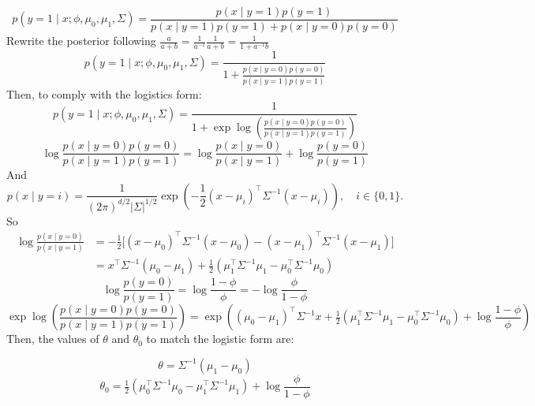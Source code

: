 \begin{answer}

$$
p(y=1\mid x;\phi,\mu_0,\mu_1,\Sigma)
= \frac{p(x\mid y=1)p(y=1)}
       {p(x\mid y=1)p(y=1) + p(x\mid y=0)p(y=0)}
$$
Rewrite the posterior following $\frac{a}{a+b} = \frac{1}{a^{-1}} \frac{1}{a+b} = \frac{1}{1+a^{-1}b}$
$$
p(y=1\mid x;\phi,\mu_0,\mu_1,\Sigma)
= \frac{1}
       {1 + \frac{p(x\mid y=0)p(y=0)}{p(x\mid y=1)p(y=1)}}
$$
Then, to comply with the logistics form:
$$
p(y=1\mid x;\phi,\mu_0,\mu_1,\Sigma)
= \frac{1}
       {1 + \exp \log \left( \frac{p(x\mid y=0)p(y=0)}{p(x\mid y=1)p(y=1)} \right)}
$$
$$
\log\frac{p(x\mid y=0)p(y=0)}{p(x\mid y=1)p(y=1)}
= \log \frac{p(x\mid y=0)}{p(x\mid y=1)}
+ \log \frac{p(y=0)}{p(y=1)}
$$
And
$$
p(x\mid y=i)
= \frac{1}{(2\pi)^{d/2}|\Sigma|^{1/2}}
  \exp\!\left(-\frac12(x-\mu_i)^{\top}\Sigma^{-1}(x-\mu_i)\right),
  \quad i\in\{0,1\}.
$$
So
$$
\begin{align}
\log \frac{p(x\mid y=0)}{p(x\mid y=1)}
&= -\frac{1}{2}\Big[
(x-\mu_0)^{\top}\Sigma^{-1}(x-\mu_0)
- (x-\mu_1)^{\top}\Sigma^{-1}(x-\mu_1)
\Big] \\
&= x^{\top}\Sigma^{-1}(\mu_0-\mu_1)
   + \tfrac{1}{2}(\mu_1^{\top}\Sigma^{-1}\mu_1 - \mu_0^{\top}\Sigma^{-1}\mu_0)
\end{align}
$$
$$
\log \frac{p(y=0)}{p(y=1)} = \log \frac{1-\phi}{\phi} = - \log \frac{\phi}{1-\phi}
$$
$$
\exp \log \left( \frac{p(x\mid y=0)p(y=0)}{p(x\mid y=1)p(y=1)} \right)
= \exp \left(
(\mu_0-\mu_1)^{\top}\Sigma^{-1}x
   + \tfrac{1}{2}(\mu_1^{\top}\Sigma^{-1}\mu_1 - \mu_0^{\top}\Sigma^{-1}\mu_0)
+ \log \frac{1-\phi}{\phi}
\right)
$$
Then, the values of $\theta$ and $\theta_{0}$ to match the logistic form are:

$$
\boxed{
\theta = \Sigma^{-1}(\mu_{1}-\mu_{0})
}
$$
$$
\boxed{
\theta_{0} 
= \tfrac{1}{2}(\mu_0^{\top}\Sigma^{-1}\mu_0 - \mu_1^{\top}\Sigma^{-1}\mu_1)
+ \log \frac{\phi}{1-\phi}
}
$$
\end{answer}
